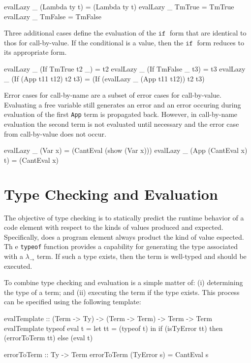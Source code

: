 \documentclass[10pt]{article}
\newcommand{\IF}{\ensuremath{\mathtt{ if \;}}}
\begin{document}
\begin{code}
  evalLazy _ (Lambda ty t) = (Lambda ty t)
  evalLazy _ TmTrue = TmTrue
  evalLazy _ TmFalse = TmFalse
\end{code}

Three additional cases define the evaluation of the $\IF$ form that
are identical to thos for call-by-value.  If the conditional is a
value, then the $\IF$ form reduces to its appropriate form.

\begin{code}
  evalLazy _ (If TmTrue t2 _) = t2
  evalLazy _ (If TmFalse _ t3) = t3
  evalLazy _ (If (App t11 t12) t2 t3) = 
    (If (evalLazy _ (App t11 t12)) t2 t3)
\end{code}

Error cases for call-by-name are a subset of error cases for
call-by-value.  Evaluating a free variable still generates an error
and an error occuring during evaluation of the first \texttt{App} term
is propagated back.  However, in call-by-name evaluation the second
term is not evaluated until necessary and the error case from
call-by-value does not occur.

\begin{code}
  evalLazy _ (Var x) = (CantEval (show (Var x)))
  evalLazy _ (App (CantEval x) t) = (CantEval x)
\end{code}

\section{Type Checking and Evaluation}

The objective of type checking is to statically predict the runtime
behavior of a code element with respect to the kinds of values
produced and expected.  Specifically, does a program element always
product the kind of value espected.  Th e \texttt{typeof} function
provides a capability for generating the type associated with a
$\lambda_\rightarrow$ term.  If such a type exists, then the term is
well-typed and should be executed.

To combine type checking and evaluation is a simple matter of: (i)
determining the type of a term; and (ii) executing the term if the
type exists.  This process can be specified using the following
template:

\begin{code}
  evalTemplate :: (Term -> Ty) -> (Term -> Term) -> Term -> Term
  evalTemplate typeof eval t =
    let tt = (typeof t) in
	if (isTyError tt) then (errorToTerm tt) else (eval t)

  errorToTerm :: Ty -> Term
  errorToTerm (TyError s) = CantEval s
\end{code}
\end{document}
